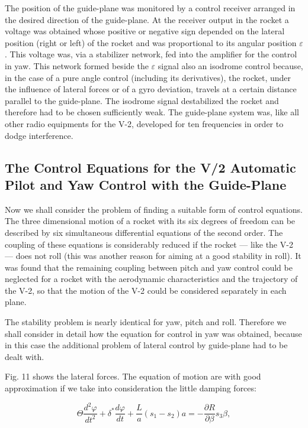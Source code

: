 \documentclass[12pt, a4paper]{article}
\begin{document}
The position of the guide-plane was monitored by a control receiver arranged in the desired direction of the guide-plane. At the receiver output in the rocket a voltage was obtained whose positive or negative sign depended on the lateral position (right or left) of the rocket and was proportional to its angular position $\varepsilon$. This voltage was, via a stabilizer network, fed into the amplifier for the control in yaw. This network formed beside the $\varepsilon$ signal also an isodrome control because, in the case of a pure angle control (including its derivatives), the rocket, under the influence of lateral forces or of a gyro deviation, travels at a certain distance parallel to the guide-plane. The isodrome signal destabilized the rocket and therefore had to be chosen sufficiently weak. The guide-plane system was, like all other radio equipments for the V-2, developed for ten frequencies in order to dodge interference.

\subsection{The Control Equations for the V/2 Automatic Pilot and Yaw Control with the Guide-Plane}

Now we shall consider the problem of finding a suitable form of control equations. The three dimensional motion of a rocket with its six degrees of freedom can be described by six simultaneous differential equations of the second order. The coupling of these equations is considerably reduced if the rocket — like the V-2 — does not roll (this was another reason for aiming at a good stability in roll). It was found that the remaining coupling between pitch and yaw control could be neglected for a rocket with the aerodynamic characteristics and the trajectory of the V-2, so that the motion of the V-2 could be considered separately in each plane.

The stability problem is nearly identical for yaw, pitch and roll. Therefore we shall consider in detail how the equation for control in yaw was obtained, because in this case the additional problem of lateral control by guide-plane had to be dealt with.

Fig. 11 shows the lateral forces. The equation of motion are with good approximation if we take into consideration the little damping forces:

\begin{equation}
  \Theta\frac{d^{2}\varphi}{dt^{2}}+\delta^{*}\frac{d\varphi}{dt}+\frac{L}{a}(s_{1}-s_{2})a=-\frac{\partial R}{\partial\beta}s_{3}\beta,
\end{equation}
\end{document}
